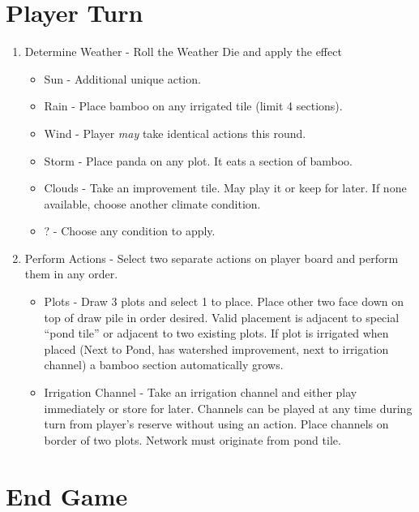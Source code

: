 \documentclass[12pt]{article}
\newenvironment{enumerateCustom}
{\begin{enumerate}
  \setlength{\itemsep}{1pt}
  \setlength{\parskip}{0pt}
  \setlength{\parsep}{0pt}}
{\end{enumerate}}
\newenvironment{itemizeCustom}
{\begin{itemize}
  \setlength{\itemsep}{1pt}
  \setlength{\parskip}{0pt}
  \setlength{\parsep}{0pt}}
{\end{itemize}}
\begin{document}
\begin{mdframed}[style = customFrame]
\begin{multicols*}{2}
\section*{Player Turn}
\begin{enumerateCustom}
	\item Determine Weather - Roll the Weather Die and apply the effect
		\begin{itemizeCustom}
			\item Sun - Additional unique action.
			\item Rain - Place bamboo on any irrigated tile (limit 4 sections).
			\item Wind - Player \emph{may} take identical actions this round.
			\item Storm - Place panda on any plot. It eats a section of bamboo.
			\item Clouds - Take an improvement tile. May play it or keep for later. If none available, choose another climate condition.
			\item ? - Choose any condition to apply.
		\end{itemizeCustom}
	\item Perform Actions - Select two separate actions on player board and perform them in any order.
		\begin{itemizeCustom}
			\item Plots - Draw 3 plots and select 1 to place. Place other two face down on top of draw pile in order desired. Valid placement is adjacent to special ``pond tile'' or adjacent to two existing plots. If plot is irrigated when placed (Next to Pond, has watershed improvement, next to irrigation channel) a bamboo section automatically grows.
			\item Irrigation Channel - Take an irrigation channel and either play immediately or store for later. Channels can be played at any time during turn from player's reserve without using an action. Place channels on border of two plots. Network must originate from pond tile.
		\end{itemizeCustom}
\end{enumerateCustom}
\section*{End Game}

\end{multicols*}
\end{mdframed}
\end{document}
